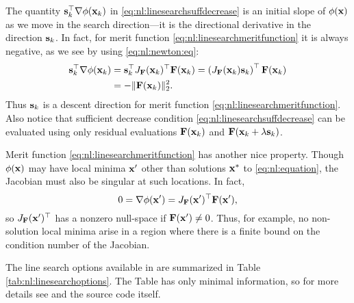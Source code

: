 The quantity $\mathbf{s}_k^\top \nabla \phi(\mathbf{x}_k)$ in \eqref{eq:nl:linesearchsuffdecrease} is an initial slope of $\phi(\mathbf{x})$ as we move in the search direction---it is the directional derivative in the direction $\mathbf{s}_k$.  In fact, for merit function \eqref{eq:nl:linesearchmeritfunction} it is always negative, as we see by using \eqref{eq:nl:newton:eq}:
\begin{align}
\mathbf{s}_k^\top \nabla \phi(\mathbf{x}_k) &= \mathbf{s}_k^\top J_{\mathbf{F}}(\mathbf{x}_k)^\top \mathbf{F}(\mathbf{x}_k) = \left(J_{\mathbf{F}}(\mathbf{x}_k) \mathbf{s}_k\right)^\top \mathbf{F}(\mathbf{x}_k) \label{eq:nl:linesearchinitslope} \\
  &= - \|\mathbf{F}(\mathbf{x}_k)\|_2^2. \notag
\end{align}
Thus $\mathbf{s}_k$ is a descent direction for merit function \eqref{eq:nl:linesearchmeritfunction}.  Also notice that sufficient decrease condition \eqref{eq:nl:linesearchsuffdecrease} can be evaluated using only residual evaluations $\mathbf{F}(\mathbf{x}_k)$ and $\mathbf{F}(\mathbf{x}_k + \lambda \mathbf{s}_k)$.

Merit function \eqref{eq:nl:linesearchmeritfunction} has another nice property.  Though $\phi(\mathbf{x})$ may have local minima $\mathbf{x}'$ other than solutions $\mathbf{x}^*$ to \eqref{eq:nl:equation}, the Jacobian must also be singular at such locations.  In fact,
\begin{equation}
0 = \nabla \phi (\mathbf{x}') = J_{\mathbf{F}}(\mathbf{x}')^\top \mathbf{F}(\mathbf{x}'),
\end{equation}
so $J_{\mathbf{F}}(\mathbf{x}')^\top$ has a nonzero null-space if $\mathbf{F}(\mathbf{x}')\ne 0$.  Thus, for example, no non-solution local minima arise in a region where there is a finite bound on the condition number of the Jacobian.

The line search options available in \PETSc are summarized in Table \ref{tab:nl:linesearchoptions}.  The Table has only minimal information, so for more details see \citep[Chapter 6]{DennisSchnabel1983} and the \PETSc source code itself.

